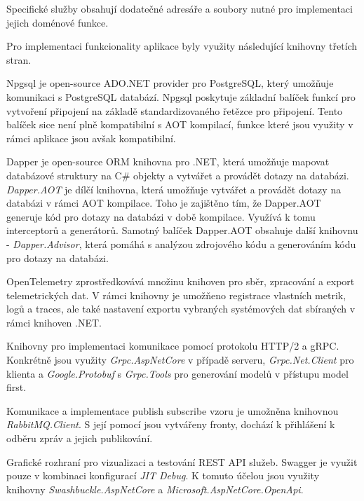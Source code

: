Specifické služby obsahují dodatečné adresáře a soubory nutné pro implementaci jejich doménové funkce.


Pro implementaci funkcionality aplikace byly využity následující knihovny třetích stran.


Npgsql je open-source ADO.NET provider pro PostgreSQL, který umožňuje komunikaci s PostgreSQL databází. Npgsql poskytuje základní balíček funkcí pro vytvoření připojení na základě standardizovaného řetězce pro připojení. Tento balíček sice není plně kompatibilní s AOT kompilací, funkce které jsou využity v rámci aplikace jsou avšak kompatibilní.


Dapper je open-source ORM knihovna pro .NET, která umožňuje mapovat databázové struktury na C\# objekty a vytvářet a provádět dotazy na databázi. \emph{Dapper.AOT} je dílčí knihovna, která umožňuje vytvářet a provádět dotazy na databázi v rámci AOT kompilace. Toho je zajištěno tím, že Dapper.AOT generuje kód pro dotazy na databázi v době kompilace. Využívá k tomu interceptorů a generátorů. Samotný balíček Dapper.AOT obsahuje další knihovnu - \emph{Dapper.Advisor}, která pomáhá s analýzou zdrojového kódu a generováním kódu pro dotazy na databázi.


OpenTelemetry zprostředkovává množinu knihoven pro sběr, zpracování a export telemetrických dat. V rámci knihovny je umožňeno registrace vlastních metrik, logů a traces, ale také nastavení exportu vybraných systémových dat sbíraných v rámci knihoven .NET.


Knihovny pro implementaci komunikace pomocí protokolu HTTP/2 a gRPC. Konkrétně jsou využity \emph{Grpc.AspNetCore} v případě serveru, \emph{Grpc.Net.Client} pro klienta a \emph{Google.Protobuf} s \emph{Grpc.Tools} pro generování modelů v přístupu model first.


Komunikace a implementace publish subscribe vzoru je umožněna knihovnou \emph{RabbitMQ.Client}. S její pomocí jsou vytvářeny fronty, dochází k přihlášení k odběru zpráv a jejich publikování.


Grafické rozhraní pro vizualizaci a testování REST API služeb. Swagger je využit pouze v kombinaci konfigurací \emph{JIT Debug}. K tomuto účelou jsou využity knihovny \emph{Swashbuckle.AspNetCore} a \emph{Microsoft.AspNetCore.OpenApi}.

